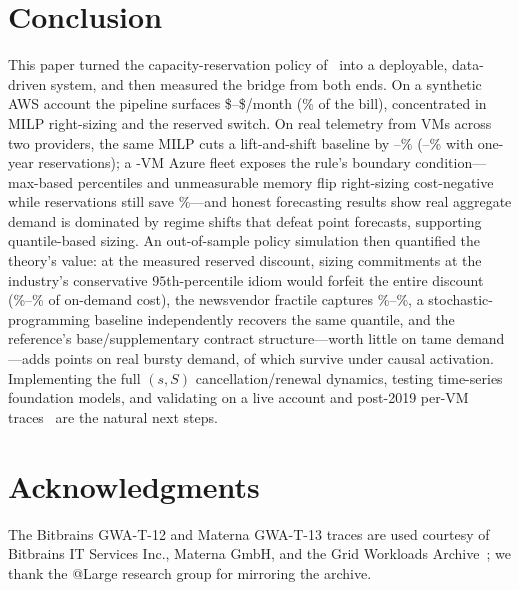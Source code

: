 \documentclass[10pt,journal]{IEEEtran}
\begin{document}
\section{Conclusion}\label{sec:conclusion}
This paper turned the capacity-reservation policy of~\cite{chen2024capacity}
into a deployable, data-driven system, and then measured the bridge from
both ends. On a synthetic AWS account the pipeline surfaces
\$\jointSavings--\$\totalSavings/month (\savingsPctBill\% of the bill),
concentrated in MILP right-sizing and the reserved switch. On real
telemetry from \extTotalVms{} VMs across two providers, the same MILP cuts a
lift-and-shift baseline by \extRndSavingsPct--\extMatSavingsPct\%
(\extRndSavingsPctRi--\extMatSavingsPctRi\% with one-year reservations); a
\azVms-VM Azure fleet exposes the rule's boundary condition---max-based
percentiles and unmeasurable memory flip right-sizing cost-negative while
reservations still save \azSavingsPctRi\%---and honest forecasting results
show real aggregate demand is dominated by regime shifts that defeat point
forecasts, supporting quantile-based sizing. An out-of-sample policy simulation then quantified the theory's
value: at the measured reserved discount, sizing commitments at the
industry's conservative $95$th-percentile idiom would forfeit the entire
discount (\polPctHeur\%--\extPolPctHeur\% of on-demand cost), the newsvendor
fractile captures \polPctNv\%--\extPolPctNv\%, a stochastic-programming
baseline independently recovers the same quantile, and the reference's
base/supplementary contract structure---worth little on tame demand---adds
\extPolDualGain{} points on real bursty demand, \extPolDualcGain{} of which
survive under causal activation. Implementing the full $(s,S)$
cancellation/renewal dynamics, testing time-series foundation models, and
validating on a live account and post-2019 per-VM
traces~\cite{uhlig2025sap} are the natural next steps.

\section*{Acknowledgments}
The Bitbrains GWA-T-12 and Materna GWA-T-13 traces are used courtesy of
Bitbrains IT Services Inc., Materna GmbH, and the Grid Workloads
Archive~\cite{iosup2008gwa}; we thank the @Large research group for
mirroring the archive.



\end{document}
